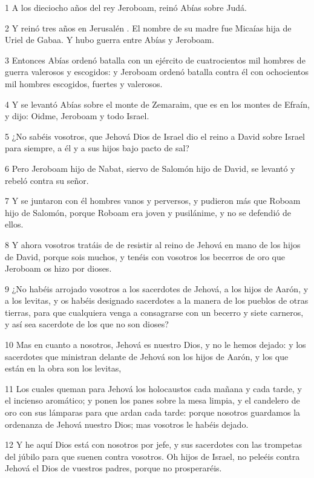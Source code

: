 \par 1  A los dieciocho años del rey Jeroboam, reinó Abías sobre Judá.
\par 2  Y reinó tres años en Jerusalén . El nombre de su madre fue Micaías hija de Uriel de Gabaa. Y hubo guerra entre Abías y Jeroboam.
\par 3 Entonces Abías ordenó batalla con un ejército de cuatrocientos mil hombres de guerra valerosos y escogidos: y Jeroboam ordenó batalla contra él con ochocientos mil hombres escogidos, fuertes y valerosos.
\par 4 Y se levantó Abías sobre el monte de Zemaraim, que es en los montes de Efraín, y dijo: Oidme, Jeroboam y todo Israel.
\par 5 ¿No sabéis vosotros, que Jehová Dios de Israel dio el reino a David sobre Israel para siempre, a él y a sus hijos bajo pacto de sal?
\par 6 Pero Jeroboam hijo de Nabat, siervo de Salomón hijo de David, se levantó y rebeló contra su señor.
\par 7 Y se juntaron con él hombres vanos y perversos, y pudieron más que Roboam hijo de Salomón, porque Roboam era joven y pusilánime, y no se defendió de ellos. 
\par 8 Y ahora vosotros tratáis de de resistir al reino de Jehová en mano de los hijos de David, porque sois muchos, y tenéis con vosotros los becerros de oro que Jeroboam os hizo por dioses.
\par 9 ¿No habéis arrojado vosotros a los sacerdotes de Jehová, a los hijos de Aarón, y a los levitas, y os habéis designado sacerdotes a la manera de los pueblos de otras tierras, para que cualquiera venga a consagrarse con un becerro y siete carneros, y así sea sacerdote de los que no son dioses?
\par 10 Mas en cuanto a nosotros, Jehová es nuestro Dios, y no le hemos dejado: y los sacerdotes que ministran delante de Jehová son los hijos de Aarón, y los que están en la obra son los levitas,
\par 11 Los cuales queman para Jehová los holocaustos cada mañana y cada tarde, y el incienso aromático; y ponen los panes sobre la mesa limpia, y el candelero de oro con sus lámparas para que ardan cada tarde: porque nosotros guardamos la ordenanza de Jehová nuestro Dios; mas vosotros le habéis dejado.
\par 12 Y he aquí Dios está con nosotros por jefe, y sus sacerdotes con las trompetas del júbilo para que suenen contra vosotros. Oh hijos de Israel, no peleéis contra Jehová el Dios de vuestros padres, porque no prosperaréis.
